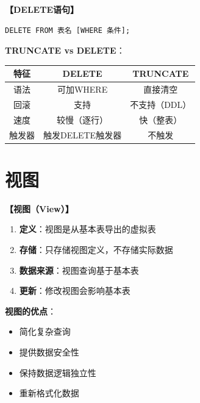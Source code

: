 \documentclass[12pt, a4paper]{article}
\newenvironment{bluebox}[1]{%
  \begin{trivlist}
  \item[\hskip\labelsep \textbf{#1}]
  \setlength{\parskip}{0.5ex}
  \setlength{\itemsep}{0.5ex}
}{%
  \end{trivlist}
}
\begin{document}
\begin{bluebox}{数据删除}
	\textbf{【DELETE语句】}

	\begin{verbatim}
DELETE FROM 表名 [WHERE 条件];
	\end{verbatim}

	\textbf{TRUNCATE vs DELETE}：
	\begin{tabular}{|c|c|c|}
		\hline
		\textbf{特征} & \textbf{DELETE} & \textbf{TRUNCATE} \\
		\hline
		语法          & 可加WHERE         & 直接清空              \\
		\hline
		回滚          & 支持              & 不支持（DDL）          \\
		\hline
		速度          & 较慢（逐行）          & 快（整表）             \\
		\hline
		触发器         & 触发DELETE触发器     & 不触发               \\
		\hline
	\end{tabular}
\end{bluebox}

\section{视图}

\begin{bluebox}{视图概念}
	\textbf{【视图（View）】}

	\begin{enumerate}[leftmargin=*, label=\textbf{\arabic*.}]
		\item \textbf{定义}：视图是从基本表导出的虚拟表
		\item \textbf{存储}：只存储视图定义，不存储实际数据
		\item \textbf{数据来源}：视图查询基于基本表
		\item \textbf{更新}：修改视图会影响基本表
	\end{enumerate}

	\textbf{视图的优点}：
	\begin{itemize}
		\item 简化复杂查询
		\item 提供数据安全性
		\item 保持数据逻辑独立性
		\item 重新格式化数据
	\end{itemize}
\end{bluebox}
\end{document}

